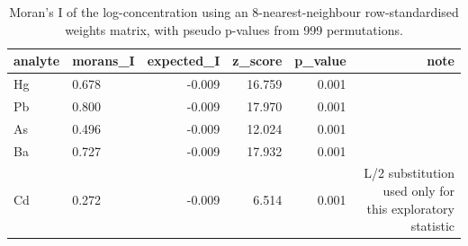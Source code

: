 \begin{table}[htbp]
\centering
\caption{Moran's I of the log-concentration using an 8-nearest-neighbour row-standardised weights matrix, with pseudo p-values from 999 permutations.}
\label{tab:moran}
\footnotesize
\begin{tabular}{llrrrr}
\toprule
analyte & morans\_I & expected\_I & z\_score & p\_value & note \\
\midrule
Hg & 0.678 & -0.009 & 16.759 & 0.001 &  \\
Pb & 0.800 & -0.009 & 17.970 & 0.001 &  \\
As & 0.496 & -0.009 & 12.024 & 0.001 &  \\
Ba & 0.727 & -0.009 & 17.932 & 0.001 &  \\
Cd & 0.272 & -0.009 & 6.514 & 0.001 & L/2 substitution used only for this exploratory statistic \\
\bottomrule
\end{tabular}
\end{table}
